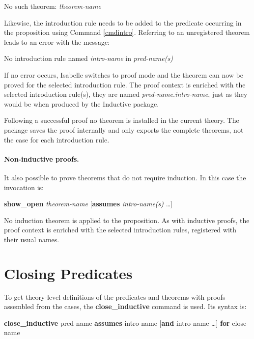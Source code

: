 \begin{err}
No such theorem: \emph{theorem-name}
\end{err}

Likewise, the introduction rule needs to be added to the predicate occurring in the proposition using Command \ref{cmdintro}.
%
Referring to an unregistered theorem leads to an error with the message:
%

\begin{err}
No introduction rule named \emph{intro-name} in \textit{pred-name(s)}
\end{err}

If no error occurs, Isabelle switches to proof mode and the theorem can now be proved for the selected introduction rule.
%
The proof context is enriched with the selected introduction rule(s), they are named \emph{pred-name.intro-name}, just as they would be when produced by the Inductive package.
%

Following a successful proof no theorem is installed in the current theory.
%
The package saves the proof internally and only exports the complete theorems, not the case for each introduction rule.
%

\paragraph{Non-inductive proofs.} It also possible to prove theorems that do not require induction. In this case the invocation is:

\begin{cmd} \label{cmdshowdirect}
\textbf{show\_open} \textit{theorem-name} [\textbf{assumes} \textit{intro-name(s)} \dots]
\end{cmd}

No induction theorem is applied to the proposition.
%
As with inductive proofs, the proof context is enriched with the selected introduction rules, registered with their usual names.
%

\section{Closing Predicates}

To get theory-level definitions of the predicates and theorems with proofs assembled from the cases, the \textbf{close\_inductive} command is used.
%
Its syntax is:
%

\begin{cmd}
\textbf{close\_inductive} pred-name \textbf{assumes} intro-name [\textbf{and} intro-name \dots] \textbf{for} close-name
\end{cmd}

